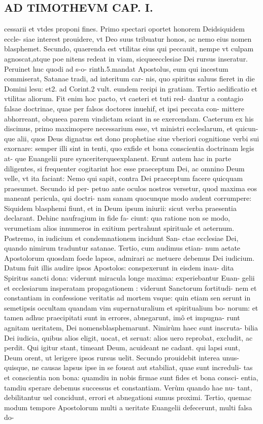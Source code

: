 \documentclass{article}
\begin{document}
\begin{pages}
\section*{AD TIMOTHEVM CAP. I. }
\marginpar{[ p.61 ]}\pstart cessarii et vtdes proponi fines. Primo spectari oportet honorem Deidsiquidem eccle- siae interest prouidere, vt Deo suus tribuatur honos, ac nemo eius nomen blasphemet. Secundo, quaerenda est vtilitas eius qui peccauit, nempe vt culpam agnoscat,atque  poe nitens redeat in viam, sicqueecclesiae Dei rursus inseratur. Peruinet huc quodi ad s-o- rinth.5.mandat Apostolus, eum qui incestum commiserat, Satanae tradi, ad interitum car- nis, quo spiritus saluus fieret in die Domini lesu: et2. ad Corint.2 vult. eundem recipi in gratiam. Tertio aedificatio et vtilitas aliorum. Fit enim hoc pacto, vt caeteri et tuti red- dantur a contagio falsae doctrinae, quae per falsos doctores inuehif, et ipsi peccata con- mittere abhorreant, obqueea parem vindictam sciant in se exercendam. Caeterum ex his discimus, primo maximopere necessarium esse, vt ministri eccleslarum, et quicun- que alii, quos Deus dignatus est dono prophetiae siue vberiori cognitione verbi sui exornare: semper illi sint in tenti, quo exfide et bona conscientia doctrinam legis at- que Euangelii pure synceriterqueexplanent. Erunt autem hac in parte diligentes, si frequenter cogitarint hoc esse praeceptum Dei, ac omnino Deum velle, vt ita faciant: Nemo qui sapit, contra Dei praeceptum facere quicquam praesumet. Secundo id per- petuo ante oculos nostros versetur, quod maxima eos maneant pericula, qui doctri- nam sanam quocunque  modo audent corrumpere: Siquidem blasphemi fiunt, et in Deum ipsum iniurii: sicut verba praesentia declarant. Dehinc naufragium in fide fa- ciunt: qua ratione non se modo, verumetiam alios innumeros in exitium pertrahunt spirituale et aeternum. Postremo, in iudicium et condemnationem incidunt San- ctae ecclesiae Dei, quando nimirum traduntur satanae. Tertio, cum audimus etian- num aetate Apostolorum quosdam foede lapsos, admirari ac metuere debemus Dei iudicium. Datum fuit illis audire ipsos Apostolos: conspexerunt in eisdem inau- dita Spiritus sancti dona: viderunt miracula longe maxima: experiebantur Euan- gelii et ecclesiarum insperatam propagationem : viderunt Sanctorum fortitudi- nem et constantiam in confessione veritatis ad mortem vsque: quin etiam sen serunt in semetipsis occultam quandam vim supernaturalium et spiritualium bo- norum: et tamen adhuc praecipitati sunt in errores, abnegarunt, imô et impugna- runt agnitam ueritatem, Dei nomensblasphemarunt. Nimirùm haec sunt inscruta- bilia Dei iudicia, quibus alios eligit, uocat, et seruat: alios uero reprobat, excludit, ac perdit. Qui igitur stant, timeant Deum, acuideant ne cadant. qui lapsi sunt, Deum orent, ut lerigere ipsos rursus uelit. Secundo prouidebit interea unus- quisque, ne causas lapsus ipse in se foueat aut stabiliat, quae sunt increduli- tas et conscientia non bona: quamdiu in nobis firmae sunt fides et bona consci- entia, tamdiu sperare debemus successus et constantiam. Verùm quando hae nu- tant, debilitantur uel concidunt, errori et abnegationi sumus proximi. Tertio, quemac modum tempore Apostolorum multi a ueritate Euangelii defecerunt, multi falsa do- 
\end{pages}
\end{document}
